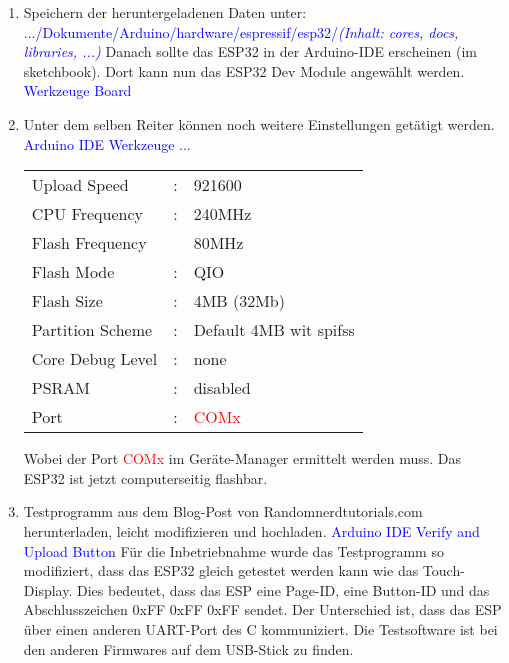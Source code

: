 \begin{enumerate}
\item Speichern der heruntergeladenen Daten unter:\newline
\textcolor{blue}{.../Dokumente/Arduino/hardware/espressif/esp32/\textit{(Inhalt: cores, docs, libraries, ...)}}\newline
Danach sollte das ESP32 in der Arduino-IDE erscheinen (im sketchbook). Dort kann nun das ESP32 Dev Module angewählt werden.\newline
\textcolor{blue} {Werkzeuge \textrightarrow Board}\newline
\item Unter dem selben Reiter können noch weitere Einstellungen getätigt werden.\newline
\textcolor{blue}{Arduino IDE \textrightarrow Werkzeuge \textrightarrow ...}\newline
\begin{tabular}{lll}
Upload Speed & : & 921600\\
CPU Frequency & : & 240MHz\\
Flash Frequency & & 80MHz\\
Flash Mode & : & QIO\\
Flash Size & : & 4MB (32Mb)\\
Partition Scheme & : & Default 4MB wit spifss\\
Core Debug Level & : & none\\
PSRAM & : & disabled\\
Port & : & \textcolor{red}{COMx}\\
\end{tabular}

Wobei der Port \textcolor{red}{COMx} im Geräte-Manager ermittelt werden muss. Das ESP32 ist jetzt computerseitig flashbar.\newpage

\item Testprogramm aus dem Blog-Post von Randomnerdtutorials.com herunterladen, leicht modifizieren und hochladen. \cite{santos_esp32_2018}\newline
\textcolor{blue}{Arduino IDE \textrightarrow Verify and Upload Button} \newline
Für die Inbetriebnahme wurde das Testprogramm so modifiziert, dass das ESP32 gleich getestet werden kann wie das Touch-Display. Dies bedeutet, dass das ESP eine Page-ID, eine Button-ID und das Abschlusszeichen 0xFF 0xFF 0xFF sendet. Der Unterschied ist, dass das ESP über einen anderen UART-Port des \textmu C kommuniziert. Die Testsoftware ist bei den anderen Firmwares auf dem USB-Stick zu finden.\newline


\end{enumerate}
